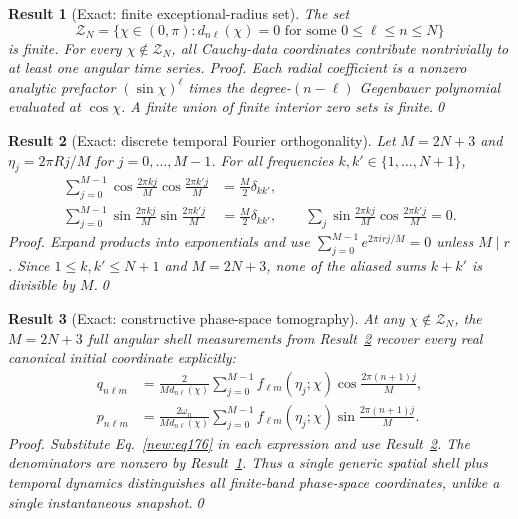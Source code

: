 \documentclass[aps,prd,onecolumn,notitlepage,groupedaddress,11pt]{revtex4-2}
\newtheorem{result}{Result}
\begin{document}
\begin{result}[\textsf{Exact}: finite exceptional-radius set]\label{new:177}
The set
\begin{equation}\label{new:eq177}
 \mathcal Z_N=\{\chi\in(0,\pi):d_{n\ell}(\chi)=0\text{ for some }0\le\ell\le n\le N\}
\end{equation}
is finite. For every $\chi\notin\mathcal Z_N$, all Cauchy-data coordinates contribute nontrivially to at least one angular time series.
\textit{Proof.} Each radial coefficient is a nonzero analytic prefactor $(\sin\chi)^\ell$ times the degree-$(n-\ell)$ Gegenbauer polynomial evaluated at $\cos\chi$. A finite union of finite interior zero sets is finite.\qed
\end{result}

\begin{result}[\textsf{Exact}: discrete temporal Fourier orthogonality]\label{new:178}
Let $M=2N+3$ and $\eta_j=2\pi Rj/M$ for $j=0,\ldots,M-1$. For all frequencies $k,k'\in\{1,\ldots,N+1\}$,
\begin{align}\label{new:eq178}
 \sum_{j=0}^{M-1}\cos\!\frac{2\pi kj}{M}\cos\!\frac{2\pi k'j}{M}&=\frac M2\delta_{kk'},\\
 \sum_{j=0}^{M-1}\sin\!\frac{2\pi kj}{M}\sin\!\frac{2\pi k'j}{M}&=\frac M2\delta_{kk'},\qquad
 \sum_j\sin\!\frac{2\pi kj}{M}\cos\!\frac{2\pi k'j}{M}=0.
\end{align}
\textit{Proof.} Expand products into exponentials and use $\sum_{j=0}^{M-1}e^{2\pi irj/M}=0$ unless $M\mid r$. Since $1\le k,k'\le N+1$ and $M=2N+3$, none of the aliased sums $k+k'$ is divisible by $M$.\qed
\end{result}

\begin{result}[\textsf{Exact}: constructive phase-space tomography]\label{new:179}
At any $\chi\notin\mathcal Z_N$, the $M=2N+3$ full angular shell measurements from Result~\ref{new:178} recover every real canonical initial coordinate explicitly:
\begin{align}\label{new:eq179}
 q_{n\ell m}&=\frac{2}{M d_{n\ell}(\chi)}\sum_{j=0}^{M-1}f_{\ell m}(\eta_j;\chi)\cos\!\frac{2\pi(n+1)j}{M},\\
 p_{n\ell m}&=\frac{2\omega_n}{M d_{n\ell}(\chi)}\sum_{j=0}^{M-1}f_{\ell m}(\eta_j;\chi)\sin\!\frac{2\pi(n+1)j}{M}.
\end{align}
\textit{Proof.} Substitute Eq.~\eqref{new:eq176} in each expression and use Result~\ref{new:178}. The denominators are nonzero by Result~\ref{new:177}. Thus a single \emph{generic} spatial shell plus temporal dynamics distinguishes all finite-band phase-space coordinates, unlike a single instantaneous snapshot.\qed
\end{result}
\end{document}
